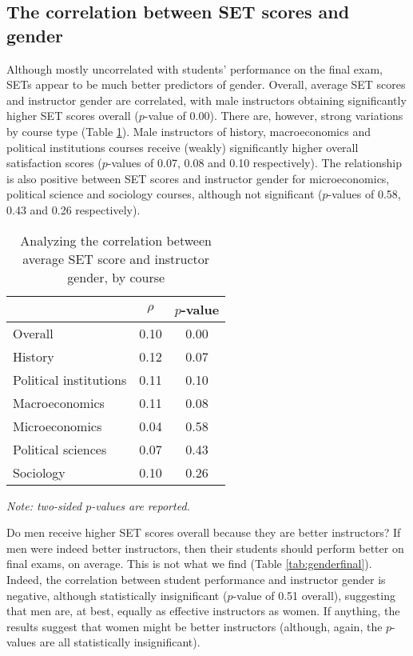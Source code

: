 \documentclass[12pt]{article}
\begin{document}
\subsection{The correlation between SET scores and gender}


Although mostly uncorrelated with students' performance on the final exam, SETs appear to be much better predictors of gender. Overall, average SET scores and instructor gender are correlated, with male instructors obtaining significantly higher SET scores overall ($p$-value of 0.00). There are, however, strong variations by course type (Table \ref{tab:instructorgender}). Male instructors of history, macroeconomics and political institutions courses receive (weakly) significantly higher overall satisfaction scores ($p$-values of 0.07, 0.08 and 0.10 respectively). The relationship is also positive between SET scores and instructor gender for microeconomics, political science and sociology courses, although not significant ($p$-values of 0.58, 0.43 and 0.26 respectively).   

\begin{table}[htbp]
  \centering
  \footnotesize 
  \caption{Analyzing the correlation between average SET score and instructor gender, by course}
    \begin{tabular}{lcc}
    \toprule 
                          & $\rho$  & $p$-value     \\
   \midrule
    Overall &                 0.10       & 0.00     \\
    History &                 0.12       & 0.07     \\
    Political institutions &  0.11       & 0.10     \\
    Macroeconomics &          0.11       & 0.08     \\
    Microeconomics &          0.04       & 0.58     \\
    Political sciences &      0.07       & 0.43     \\
    Sociology &               0.10       & 0.26     \\
    \bottomrule
    \end{tabular}%
 \label{tab:instructorgender}%
  
  \textit{Note: two-sided $p$-values are reported.}
\end{table}%
\normalsize


Do men receive higher SET scores overall because they are better instructors? If men were indeed better instructors, then their students should perform better on final exams, on average. This is not what we find (Table \ref{tab:genderfinal}). Indeed, the correlation between student performance and instructor gender is negative, although statistically insignificant ($p$-value of 0.51 overall), suggesting that men are, at best, equally as effective instructors as women. If anything, the results suggest that women might be better instructors (although, again, the $p$-values are all statistically insignificant). 
\end{document}
